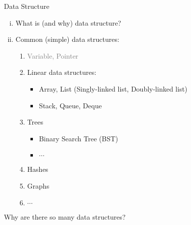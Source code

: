 \begin{frame}{}
  \begin{center}
    {\LARGE Data Structure} \\[0.60cm]
  \end{center}

  \begin{enumerate}[(i)]
    \setlength{\itemsep}{8pt}
    \item {\large What is (and why) data structure?}
      \pause
    \item {\large Common (simple) data structures:}
      \begin{enumerate}[(1)]
	\setlength{\itemsep}{4pt}
	\item \textcolor{gray}{Variable, Pointer}
	\item Linear data structures:
	  \begin{itemize}
	    \item Array, List (Singly-linked list, Doubly-linked list)
	    \item Stack, Queue, Deque
	  \end{itemize}
	\item Trees
	  \begin{itemize}
	    \item Binary Search Tree (BST)
	    \item $\cdots$
	  \end{itemize}
	\item Hashes
	\item Graphs
	\item $\cdots$
      \end{enumerate}
  \end{enumerate}
\end{frame}

\begin{frame}{}
  \centerline{\large Why are there so many data structures?}

\end{frame}
